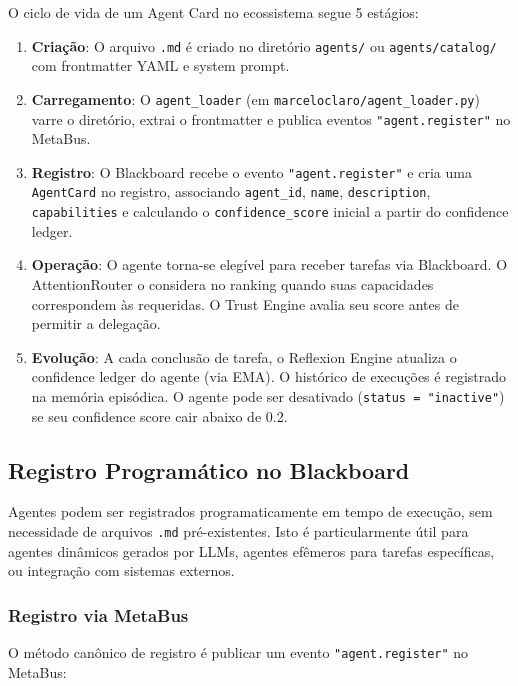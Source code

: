 O ciclo de vida de um Agent Card no ecossistema segue 5 estágios:

\begin{enumerate}
  \item \textbf{Criação}: O arquivo \texttt{.md} é criado no diretório \texttt{agents/} ou \texttt{agents/catalog/} com frontmatter YAML e system prompt.
  \item \textbf{Carregamento}: O \texttt{agent\_loader} (em \texttt{marceloclaro/agent\_loader.py}) varre o diretório, extrai o frontmatter e publica eventos \texttt{"agent.register"} no MetaBus.
  \item \textbf{Registro}: O Blackboard recebe o evento \texttt{"agent.register"} e cria uma \texttt{AgentCard} no registro, associando \texttt{agent\_id}, \texttt{name}, \texttt{description}, \texttt{capabilities} e calculando o \texttt{confidence\_score} inicial a partir do confidence ledger.
  \item \textbf{Operação}: O agente torna-se elegível para receber tarefas via Blackboard. O AttentionRouter o considera no ranking quando suas capacidades correspondem às requeridas. O Trust Engine avalia seu score antes de permitir a delegação.
  \item \textbf{Evolução}: A cada conclusão de tarefa, o Reflexion Engine atualiza o confidence ledger do agente (via EMA). O histórico de execuções é registrado na memória episódica. O agente pode ser desativado (\texttt{status = "inactive"}) se seu confidence score cair abaixo de 0.2.
\end{enumerate}

\subsection{Registro Programático no Blackboard}
\label{sec:registro-blackboard}

Agentes podem ser registrados programaticamente em tempo de execução, sem necessidade de arquivos \texttt{.md} pré-existentes. Isto é particularmente útil para agentes dinâmicos gerados por LLMs, agentes efêmeros para tarefas específicas, ou integração com sistemas externos.

\subsubsection{Registro via MetaBus}

O método canônico de registro é publicar um evento \texttt{"agent.register"} no MetaBus:

